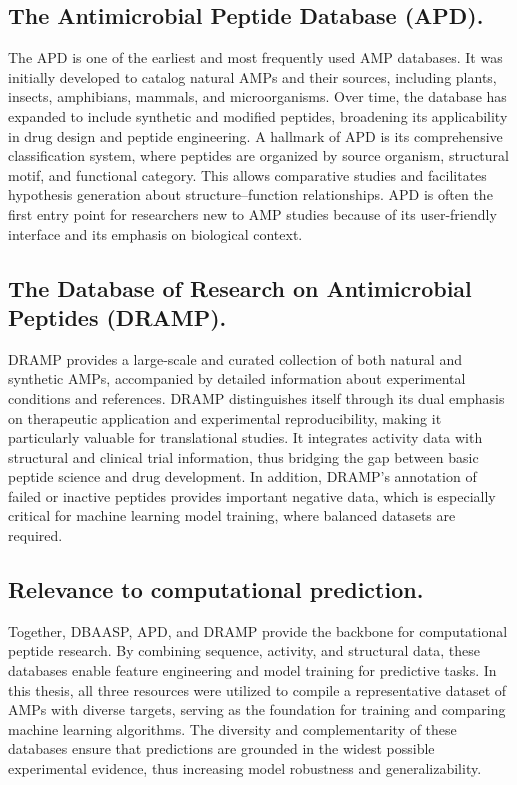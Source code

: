 \documentclass[a4paper,twoside,12pt]{book}
\begin{document}
\subsection{The Antimicrobial Peptide Database (APD).}
The APD \cite{bib:wang2016_apd} is one of the earliest and most frequently used AMP databases. It was initially developed to catalog natural AMPs and their sources, including plants, insects, amphibians, mammals, and microorganisms. Over time, the database has expanded to include synthetic and modified peptides, broadening its applicability in drug design and peptide engineering. A hallmark of APD is its comprehensive classification system, where peptides are organized by source organism, structural motif, and functional category. This allows comparative studies and facilitates hypothesis generation about structure–function relationships. APD is often the first entry point for researchers new to AMP studies because of its user-friendly interface and its emphasis on biological context.

\subsection{The Database of Research on Antimicrobial Peptides (DRAMP).}
DRAMP \cite{bib:kang2019} provides a large-scale and curated collection of both natural and synthetic AMPs, accompanied by detailed information about experimental conditions and references. DRAMP distinguishes itself through its dual emphasis on therapeutic application and experimental reproducibility, making it particularly valuable for translational studies. It integrates activity data with structural and clinical trial information, thus bridging the gap between basic peptide science and drug development. In addition, DRAMP’s annotation of failed or inactive peptides provides important negative data, which is especially critical for machine learning model training, where balanced datasets are required.

\subsection{Relevance to computational prediction.}
Together, DBAASP, APD, and DRAMP provide the backbone for computational peptide research. By combining sequence, activity, and structural data, these databases enable feature engineering and model training for predictive tasks. In this thesis, all three resources were utilized to compile a representative dataset of AMPs with diverse targets, serving as the foundation for training and comparing machine learning algorithms. The diversity and complementarity of these databases ensure that predictions are grounded in the widest possible experimental evidence, thus increasing model robustness and generalizability.
\end{document}
